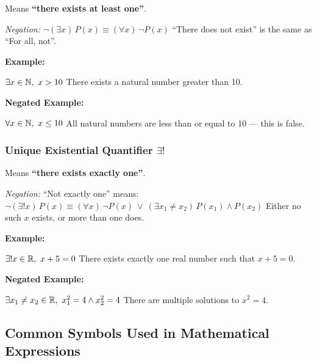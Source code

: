 Means \textbf{``there exists at least one''}.
 \vspace{\baselineskip}
			
\emph{Negation:}  \(\neg (\exists x)\,P(x) \equiv (\forall x)\, \neg P(x)\) ``There does not exist'' is 
the same as ``For all, not''.
\vspace{\baselineskip}

\textbf{Example:} 
\vspace{\baselineskip}

\(\exists x \in \mathbb{N},\ x > 10\) There exists a natural number greater than 10.
\vspace{\baselineskip}
			
\textbf{Negated Example:}  
\vspace{\baselineskip}

\(\forall x \in \mathbb{N},\ x \leq 10\) All natural numbers are less than or equal to 10 — this is false.

\subsubsection{Unique Existential Quantifier \texorpdfstring{\(\exists ! \)}{}} 
	
Means \textbf{``there exists exactly one''}.
\vspace{\baselineskip}
		
\emph{Negation:} ``Not exactly one'' means:
\(\neg (\exists! x)\, P(x) \equiv (\forall x)\, \neg P(x)\ \lor\ (\exists x_1 \neq x_2)\, P(x_1) \land 
P(x_2)\) Either no such \( x \) exists, or more than one does.
\vspace{\baselineskip}

\textbf{Example:} 
\vspace{\baselineskip}

\(\exists! x \in \mathbb{R},\ x + 5 = 0\) There exists exactly one real number such that \( x + 5 = 0 \).
\vspace{\baselineskip}

\textbf{Negated Example:}  
\vspace{\baselineskip}

\(\exists x_1 \neq x_2 \in \mathbb{R},\ x_1^2 = 4 \land x_2^2 = 4\) There are multiple solutions to 
\( x^2 = 4 \).

\subsection{Common Symbols Used in Mathematical Expressions}

